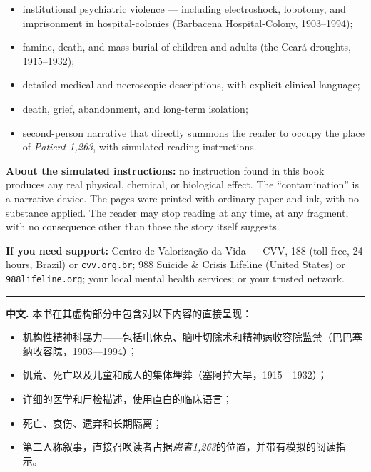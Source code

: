 \begin{itemize}
\itemsep0.4em
\item institutional psychiatric violence --- including electroshock, lobotomy, and imprisonment in hospital-colonies (Barbacena Hospital-Colony, 1903--1994);
\item famine, death, and mass burial of children and adults (the Ceará droughts, 1915--1932);
\item detailed medical and necroscopic descriptions, with explicit clinical language;
\item death, grief, abandonment, and long-term isolation;
\item second-person narrative that directly summons the reader to occupy the place of \textit{Patient 1,263}, with simulated reading instructions.
\end{itemize}

\noindent \textbf{About the simulated instructions:} no instruction found in this book produces any real physical, chemical, or biological effect. The ``contamination'' is a narrative device. The pages were printed with ordinary paper and ink, with no substance applied. The reader may stop reading at any time, at any fragment, with no consequence other than those the story itself suggests.

\noindent \textbf{If you need support:} Centro de Valorização da Vida --- CVV, 188 (toll-free, 24 hours, Brazil) or \texttt{cvv.org.br}; 988 Suicide \& Crisis Lifeline (United States) or \texttt{988lifeline.org}; your local mental health services; or your trusted network.

\vspace{1em}
\noindent\rule{\textwidth}{0.5pt}
\vspace{1em}

\noindent\textbf{中文.} 本书在其虚构部分中包含对以下内容的直接呈现：

\begin{itemize}
\itemsep0.4em
\item 机构性精神科暴力——包括电休克、脑叶切除术和精神病收容院监禁（巴巴塞纳收容院，1903—1994）；
\item 饥荒、死亡以及儿童和成人的集体埋葬（塞阿拉大旱，1915—1932）；
\item 详细的医学和尸检描述，使用直白的临床语言；
\item 死亡、哀伤、遗弃和长期隔离；
\item 第二人称叙事，直接召唤读者占据\textit{患者1,263}的位置，并带有模拟的阅读指示。
\end{itemize}

